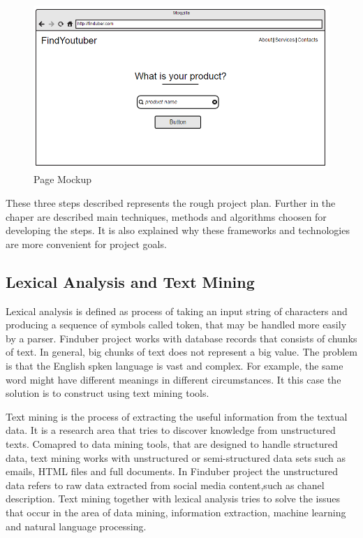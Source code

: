 \begin{figure}[!ht]
\centering
\includegraphics[width=15cm]{moch}
\caption{Page Mockup} \label{pagemockup}
\end{figure}

These three steps described represents the rough project plan. Further in the chaper are described main techniques, methods and algorithms choosen for developing the steps. It is also explained why these frameworks and technologies are more convenient for project goals. 

\subsection{Lexical Analysis and Text Mining}

Lexical analysis is defined as process of taking an input string of characters and producing a sequence of symbols called token, that may be handled more easily by a parser. Finduber project works with database records that consists of chunks of text. In general, big chunks of text does not represent a big value. The problem is that the English spken language is vast and complex. For example, the same word might have different meanings in different circumstances. It this case the solution is to construct using text mining tools. 

Text mining is the process of extracting the useful information from the textual data. It is a research area that tries to discover knowledge from unstructured texts. Comapred to data mining tools, that are designed to handle structured data, text mining works with unstructured or semi-structured data sets such as emails, HTML files and full documents.\cite{survey} In Finduber project the unstructured data refers to raw data extracted from social media content,such as chanel description. Text mining together with lexical analysis tries to solve the issues that occur in the area of data mining, information extraction, machine learning and natural language processing. 

